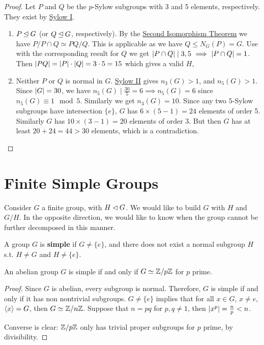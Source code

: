 \documentclass{article}
\begin{document}
\begin{proof}
    Let $P$ and $Q$ be the $p$-Sylow subgroups with 3 and 5 elements, respectively. They exist by \hyperref[thm: Sylow I]{Sylow I}.

    \begin{enumerate}
        \item[\bu{Case 1.}] $P \unlhd G$ (or $Q \unlhd G$, respectively). By the \hyperref[thm: second isomorphism theorem]{Second Isomorphism Theorem} we have $P/P \cap Q \simeq PQ/Q$. This is applicable as we have $Q \leq N_G(P) = G$. Use with the corresponding result for $Q$ we get $\left|P \cap Q\right| \mid 3, 5 \ \Longrightarrow\  \left|P \cap Q\right| = 1$. Then $\left|PQ\right| = \left|P\right| \cdot \left|Q\right| = 3 \cdot 5 = 15$ which gives a valid $H$,
        \item[\bu{Case 2.}] Neither $P$ or $Q$ is normal in $G$. \hyperref[thm: Sylow II]{Sylow II} gives $n_3(G) > 1$, and $n_5(G) > 1$. Since $\left|G\right| = 30$, we have $n_5(G) \mid \frac{30}{5} = 6 \implies n_5(G) = 6$ since $n_5(G) \equiv 1 \mod{5}$. Similarly we get $n_3(G) = 10$. Since any two $5$-Sylow subgroups have intersection $\{e\}$, $G$ has $6 \times (5-1) = 24$ elements of order 5. Similarly $G$ has $10 \times (3-1) = 20$ elements of order 3. But then $G$ has at least $20 + 24 = 44 > 30$ elements, which is a contradiction.
    \end{enumerate}
\end{proof}

\section{Finite Simple Groups}

\textstart
Consider $G$ a finite group, with $H \lhd G$. We would like to build $G$ with $H$ and $G/H$. In the opposite direction, we would like to know when the group cannot be further decomposed in this manner.

\begin{definition}[Simple]
    A group $G$ is \textbf{simple} if $G \neq \{e\}$, and there does not exist a normal subgroup $H$ s.t. $H \neq G$ and $H \neq \{e\}$.
\end{definition}

\begin{proposition}
    An abelian group $G$ is simple if and only if $G \simeq \mathbb{Z}/p\mathbb{Z}$ for $p$ prime.
\end{proposition}

\begin{proof}
    Since $G$ is abelian, every subgroup is normal. Therefore, $G$ is simple if and only if it has non nontrivial subgroups. $G \neq \{e\}$ implies that for all $x \in G$, $x \neq e$, $\left\langle x \right\rangle = G$, then $G \simeq \mathbb{Z}/n\mathbb{Z}$. Suppose that $n = pq$ for $p, q\neq 1$, then $\left|x^p\right| = \frac{n}{p} < n$.

    Converse is clear: $\mathbb{Z}/p\mathbb{Z}$ only has trivial proper subgroups for $p$ prime, by divisibility.
\end{proof}
\end{document}
